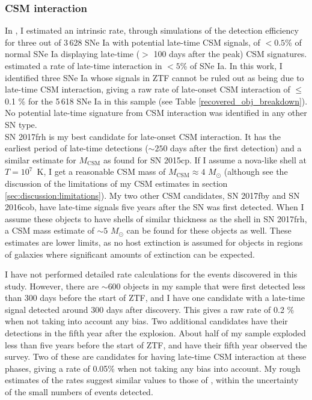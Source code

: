 \documentclass[a4paper,oneside,12pt, class=Latex/Classes/PhDthesisPSnPDF, crop=false]{standalone}
\begin{document}
\subsubsection{CSM interaction}
In \citet{Terwel_2024_paper1}, I estimated an intrinsic rate, through simulations of the detection efficiency for three out of 3\,628 SNe Ia with potential late-time CSM signals, of $<0.5$\% of normal SNe Ia displaying late-time ($>$ 100 days after the peak) CSM signatures. \cite{GALEX_Late_CSM} estimated a rate of late-time interaction in $<5$\% of SNe Ia. In this work, I identified three SNe Ia whose signals in ZTF cannot be ruled out as being due to late-time CSM interaction, giving a raw rate of late-onset CSM interaction of $\leq$0.1 \% for the 5\,618 SNe Ia in this sample (see Table \ref{recovered_obj_breakdown}). No potential late-time signature from CSM interaction was identified in any other SN type.\\

SN 2017frh is my best candidate for late-onset CSM interaction. It has the earliest period of late-time detections ($\sim 250$ days after the first detection) and a similar estimate for $M_\text{CSM}$ as \citet{2015cp} found for SN 2015cp. If I assume a nova-like shell at $T=10^7$~K, I get a reasonable CSM mass of $M_\text{CSM} \approx 4$ $M_\odot$ (although see the discussion of the limitations of my CSM estimates in section \ref{sec:discussion:limitations}). My two other CSM candidates, SN 2017fby and SN 2016cob, have late-time signals five years after the SN was first detected. When I assume these objects to have shells of similar thickness as the shell in SN 2017frh, a CSM mass estimate of $\sim 5$ $M_\odot$ can be found for these objects as well. These estimates are lower limits, as no host extinction is assumed for objects in regions of galaxies where significant amounts of extinction can be expected.

I have not performed detailed rate calculations for the events discovered in this study. However, there are $\sim600$ objects in my sample that were first detected less than 300 days before the start of ZTF, and I have one candidate with a late-time signal detected around 300 days after discovery. This gives a raw rate of 0.2 \% when not taking into account any bias. Two additional candidates have their detections in the fifth year after the explosion. About half of my sample exploded less than five years before the start of ZTF, and have their fifth year observed the survey. Two of these are candidates for having late-time CSM interaction at these phases, giving a rate of 0.05\% when not taking any bias into account. My rough estimates of the rates suggest similar values to those of \citet{Terwel_2024_paper1}, within the uncertainty of the small numbers of events detected.
\end{document}
